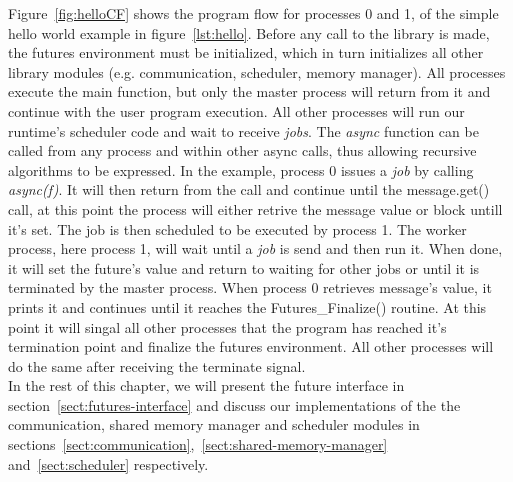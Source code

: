 Figure~\ref{fig:helloCF} shows the program flow for processes 0 and 1, of the simple
hello world example in figure~\ref{lst:hello}.  Before any call to the library is made, the futures
environment must be initialized, which in turn initializes all other library modules 
(e.g. communication, scheduler, memory manager).
All processes execute the main function, but only
the master process will return from it and continue with the user program execution.
All other processes will run our runtime's scheduler code and wait to receive \emph{jobs}.
The \emph{async} function can be called from any process 
and within other async calls, thus allowing recursive algorithms to be expressed. 
In the example, process 0 issues a \emph{job} by
calling \emph{async(f)}.  It will then return from the call and continue until
the message.get() call, at this point the process will either retrive the message value or block untill
it's set.
The job is then scheduled to be executed by process 1.  The worker process,
here process 1, will wait until a \emph{job} is send and then run it.  When done, it will set 
the future's value and return to waiting for other jobs or until it is terminated by the master
process.  When process 0 retrieves message's value, it prints it and continues until it reaches
the Futures\_Finalize() routine.  At this point it will singal all other processes that the program
has reached it's termination point and finalize the futures environment.  All other processes will
do the same after receiving the terminate signal.
\\

In the rest of this chapter, we will present the future interface in section~\ref{sect:futures-interface}
and discuss our implementations of the the communication, shared memory manager and scheduler modules in
sections~\ref{sect:communication},~\ref{sect:shared-memory-manager} and~\ref{sect:scheduler}
respectively.

